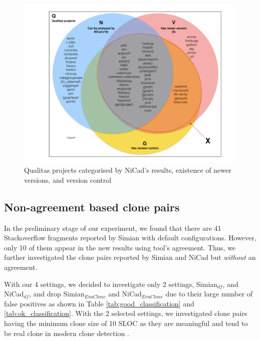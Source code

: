 \documentclass{sig-alternate-05-2015}
\begin{document}
\begin{figure}
	\centering
	\includegraphics[width=0.7\linewidth]{n+v+g}
	\caption{Qualitas projects categorised by NiCad's results, existence of newer versions, and version control}
	\label{fig:n+v+g}
\end{figure}

\subsection{Non-agreement based clone pairs}
In the preliminary stage of our experiment, we found that there are 41 Stackoverflow fragments reported by Simian with default configurations. However, only 10 of them appear in the new results using tool's agreement. Thus, we further investigated the clone pairs reported by Simian and NiCad but \textit{without} an agreement. 

With our 4 settings, we decided to investigate only 2 settings, Simian$_{df}$, and NiCad$_{df}$, and drop Simian$_{\mathrm{\textit{EvaClone}}}$ and NiCad$_{\mathrm{\textit{EvaClone}}}$ due to their large number of false positives as shown in Table \ref{tab:good_classification} and \ref{tab:ok_classification}. With the 2 selected settings, we investigated clone pairs having the minimum clone size of 10 SLOC as they are meaningful and tend to be real clone in modern clone detection \cite{Sajnani2016}. 
\end{document}
